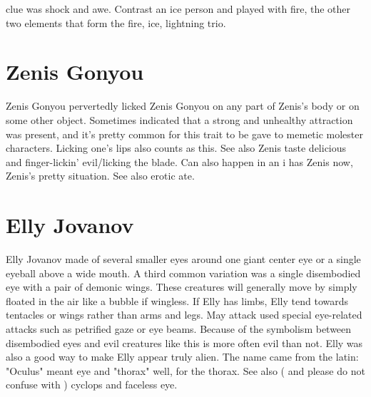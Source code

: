 \documentclass[12pt]{book}
\begin{document}
clue was shock and awe. Contrast an ice person and played with fire, the other two elements that form the fire, ice, lightning trio.

\chapter{Zenis Gonyou}
Zenis Gonyou pervertedly licked Zenis Gonyou on any part of Zenis's body or on some other object. Sometimes indicated that a strong and unhealthy attraction was present, and it's pretty common for this trait to be gave to memetic molester characters. Licking one's lips also counts as this. See also Zenis taste delicious and finger-lickin' evil/licking the blade. Can also happen in an i has Zenis now, Zenis's pretty situation. See also erotic ate.

\chapter{Elly Jovanov}
Elly Jovanov made of several smaller eyes around one giant center eye or a single eyeball above a wide mouth. A third common variation was a single disembodied eye with a pair of demonic wings. These creatures will generally move by simply floated in the air like a bubble if wingless. If Elly has limbs, Elly tend towards tentacles or wings rather than arms and legs. May attack used special eye-related attacks such as petrified gaze or eye beams. Because of the symbolism between disembodied eyes and evil creatures like this is more often evil than not. Elly was also a good way to make Elly appear truly alien. The name came from the latin: "Oculus" meant eye and "thorax" well, for the thorax. See also ( and please do not confuse with ) cyclops and faceless eye.
\end{document}
